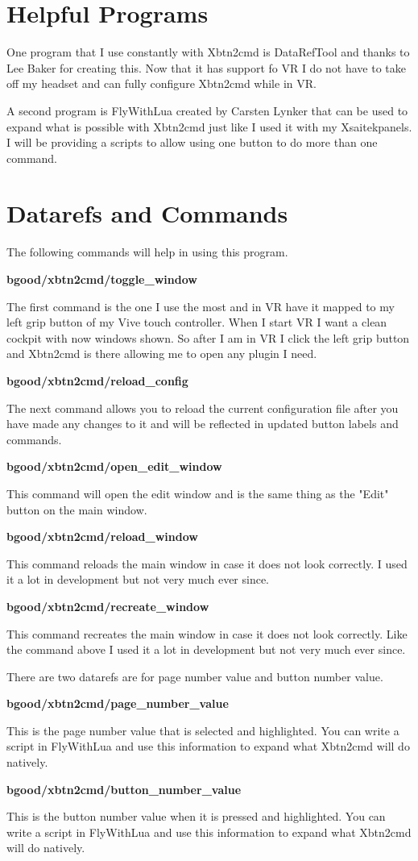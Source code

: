 \documentclass[11pt,parskip=half,a4paper]{scrartcl}
\begin{document}
\newpage
\section{Helpful Programs}

One program that I use constantly with Xbtn2cmd is DataRefTool and thanks to Lee Baker for creating this. Now that it has support fo VR I do not have to take off my headset and can fully configure Xbtn2cmd while in VR.

A second program is FlyWithLua created by Carsten Lynker that can be used to expand what is possible with Xbtn2cmd just like I used it with my Xsaitekpanels. I will be providing a scripts to allow using one button to do more than one command.

\newpage
\section{Datarefs and Commands}

The following commands will help in using this program.

{\bf bgood/xbtn2cmd/toggle\_window}

The first command is the one I use the most and in VR have it mapped to my left grip button of my Vive touch controller. When I start VR I want a clean cockpit with now windows shown. So after I am in VR I click the left grip button and Xbtn2cmd is there allowing me to open any plugin I need.


{\bf bgood/xbtn2cmd/reload\_config}

The next command allows you to reload the current configuration file after you have made any changes to it and will be reflected in updated button labels and commands.


{\bf bgood/xbtn2cmd/open\_edit\_window}

This command will open the edit window and is the same thing as the "Edit" button on the main window.


{\bf bgood/xbtn2cmd/reload\_window}

This command reloads the main window in case it does not look correctly. I used it a lot in development but not very much ever since.


{\bf bgood/xbtn2cmd/recreate\_window}

This command recreates the main window in case it does not look correctly. Like the command above I used it a lot in development but not very much ever since. \newline \newline 


There are two datarefs are for page number value and button number value.

{\bf bgood/xbtn2cmd/page\_number\_value}

This is the page number value that is selected and highlighted. You can write a script in FlyWithLua and use this information to expand what Xbtn2cmd will do natively. 


{\bf bgood/xbtn2cmd/button\_number\_value}

This is the button number value when it is pressed and highlighted. You can write a script in FlyWithLua and use this information to expand what Xbtn2cmd will do natively.
\end{document}

